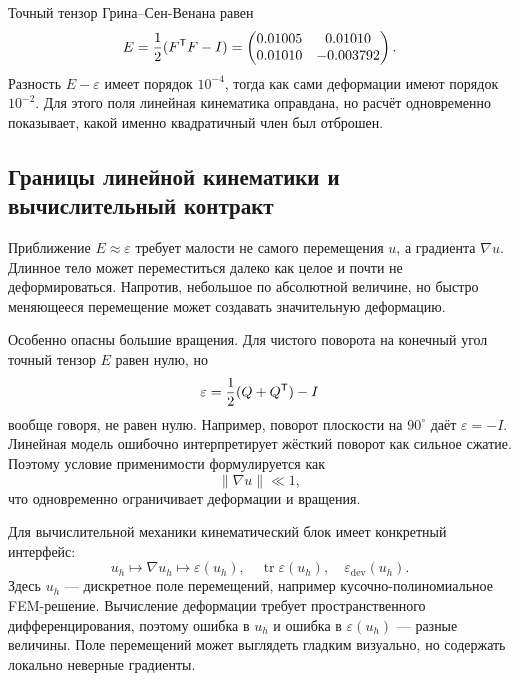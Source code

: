 Точный тензор Грина--Сен-Венана равен
\begin{equation}
\label{eq:worked-green-strain-v01}
E
=
\frac12(F^{\mathsf{T}}F-I)
=
\begin{pmatrix}
0.01005&0.01010\\
0.01010&-0.003792
\end{pmatrix}.
\end{equation}
Разность $E-\varepsilon$ имеет порядок $10^{-4}$, тогда как сами деформации имеют порядок $10^{-2}$. Для этого поля линейная кинематика оправдана, но расчёт одновременно показывает, какой именно квадратичный член был отброшен.

\subsection{Границы линейной кинематики и вычислительный контракт}

Приближение $E\approx\varepsilon$ требует малости не самого перемещения $u$, а градиента $\nabla u$. Длинное тело может переместиться далеко как целое и почти не деформироваться. Напротив, небольшое по абсолютной величине, но быстро меняющееся перемещение может создавать значительную деформацию.

Особенно опасны большие вращения. Для чистого поворота на конечный угол точный тензор $E$ равен нулю, но
\[
\varepsilon
=
\frac12(Q+Q^{\mathsf{T}})-I
\]
вообще говоря, не равен нулю. Например, поворот плоскости на $90^\circ$ даёт $\varepsilon=-I$. Линейная модель ошибочно интерпретирует жёсткий поворот как сильное сжатие. Поэтому условие применимости формулируется как
\begin{equation}
\label{eq:small-gradient-condition-v01}
\lVert\nabla u\rVert\ll1,
\end{equation}
что одновременно ограничивает деформации и вращения.

Для вычислительной механики кинематический блок имеет конкретный интерфейс:
\begin{equation}
\label{eq:kinematic-computational-contract-v01}
u_h
\longmapsto
\nabla u_h
\longmapsto
\varepsilon(u_h),
\quad
\operatorname{tr}\varepsilon(u_h),
\quad
\varepsilon_{\mathrm{dev}}(u_h).
\end{equation}
Здесь $u_h$ --- дискретное поле перемещений, например кусочно-полиномиальное FEM-решение. Вычисление деформации требует пространственного дифференцирования, поэтому ошибка в $u_h$ и ошибка в $\varepsilon(u_h)$ --- разные величины. Поле перемещений может выглядеть гладким визуально, но содержать локально неверные градиенты.

